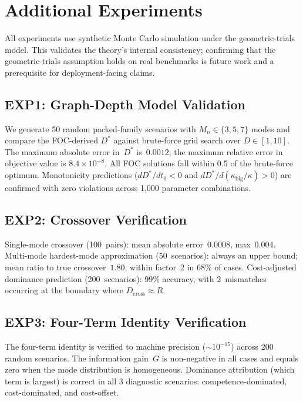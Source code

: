 \documentclass[twoside,11pt]{article}
\newcommand{\Mn}{M_n}
\newcommand{\Dstar}{D^*}
\newcommand{\Dcross}{D_{\mathrm{cross}}}
\newcommand{\kappabig}{\kappa_{\mathrm{big}}}
\begin{document}
\section{Additional Experiments}
\label{app:experiments}

All experiments use synthetic Monte Carlo simulation under the geometric-trials model.
This validates the theory's internal consistency; confirming that the geometric-trials assumption holds on real benchmarks is future work and a prerequisite for deployment-facing claims.

\subsection{EXP1: Graph-Depth Model Validation}

We generate 50 random packed-family scenarios with $\Mn \in \{3, 5, 7\}$ modes and compare the FOC-derived $\Dstar$ against brute-force grid search over $D \in [1, 10]$.
The maximum absolute error in~$\Dstar$ is~$0.0012$; the maximum relative error in objective value is $8.4 \times 10^{-8}$.
All FOC solutions fall within 0.5 of the brute-force optimum.
Monotonicity predictions ($d\Dstar/dt_0 < 0$ and $d\Dstar/d(\kappabig/\kappa) > 0$) are confirmed with zero violations across 1{,}000 parameter combinations.

\subsection{EXP2: Crossover Verification}

Single-mode crossover (100~pairs): mean absolute error~$0.0008$, max~$0.004$.
Multi-mode hardest-mode approximation (50~scenarios): always an upper bound; mean ratio to true crossover~$1.80$, within factor~$2$ in 68\% of cases.
Cost-adjusted dominance prediction (200~scenarios): 99\% accuracy, with 2~mismatches occurring at the boundary where $\Dcross \approx R$.

\subsection{EXP3: Four-Term Identity Verification}

The four-term identity is verified to machine precision ($\sim 10^{-15}$) across 200 random scenarios.
The information gain~$G$ is non-negative in all cases and equals zero when the mode distribution is homogeneous.
Dominance attribution (which term is largest) is correct in all 3 diagnostic scenarios: competence-dominated, cost-dominated, and cost-offset.
\end{document}
